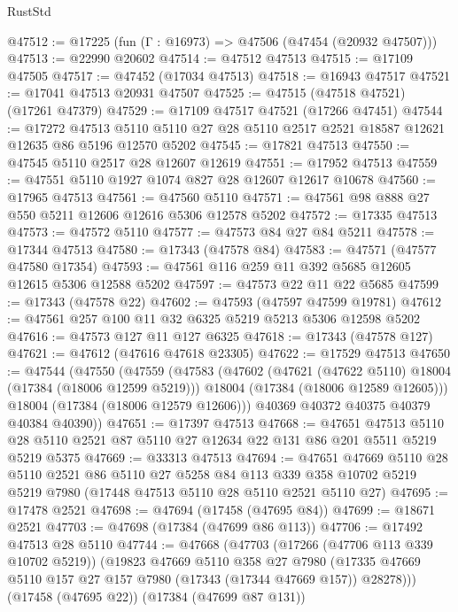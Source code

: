\begin{lexlean}{RustStd}
\begin{coremodule}
@47512 := @17225 (fun (Γ : @16973) => @47506 (@47454 (@20932 @47507)))
@47513 := @22990 @20602
@47514 := @47512 @47513
@47515 := @17109 @47505
@47517 := @47452 (@17034 @47513)
@47518 := @16943 @47517
@47521 := @17041 @47513 @20931 @47507
@47525 := @47515 (@47518 @47521) (@17261 @47379)
@47529 := @17109 @47517 @47521 (@17266 @47451)
@47544 := @17272
    @47513
    @5110
    @5110
    @27
    @28
    @5110
    @2517
    @2521
    @18587
    @12621
    @12635
    @86
    @5196
    @12570
    @5202
@47545 := @17821 @47513
@47550 := @47545 @5110 @2517 @28 @12607 @12619
@47551 := @17952 @47513
@47559 := @47551 @5110 @1927 @1074 @827 @28 @12607 @12617 @10678
@47560 := @17965 @47513
@47561 := @47560 @5110
@47571 := @47561 @98 @888 @27 @550 @5211 @12606 @12616 @5306 @12578 @5202
@47572 := @17335 @47513
@47573 := @47572 @5110
@47577 := @47573 @84 @27 @84 @5211
@47578 := @17344 @47513
@47580 := @17343 (@47578 @84)
@47583 := @47571 (@47577 @47580 @17354)
@47593 := @47561 @116 @259 @11 @392 @5685 @12605 @12615 @5306 @12588 @5202
@47597 := @47573 @22 @11 @22 @5685
@47599 := @17343 (@47578 @22)
@47602 := @47593 (@47597 @47599 @19781)
@47612 := @47561 @257 @100 @11 @32 @6325 @5219 @5213 @5306 @12598 @5202
@47616 := @47573 @127 @11 @127 @6325
@47618 := @17343 (@47578 @127)
@47621 := @47612 (@47616 @47618 @23305)
@47622 := @17529 @47513
@47650 := @47544
    (@47550
      (@47559
        (@47583
          (@47602
            (@47621 (@47622 @5110) @18004 (@17384 (@18006 @12599 @5219)))
            @18004
            (@17384 (@18006 @12589 @12605)))
          @18004
          (@17384 (@18006 @12579 @12606)))
        @40369
        @40372
        @40375
        @40379
        @40384
        @40390))
@47651 := @17397 @47513
@47668 := @47651
    @47513
    @5110
    @28
    @5110
    @2521
    @87
    @5110
    @27
    @12634
    @22
    @131
    @86
    @201
    @5511
    @5219
    @5219
    @5375
@47669 := @33313 @47513
@47694 := @47651
    @47669
    @5110
    @28
    @5110
    @2521
    @86
    @5110
    @27
    @5258
    @84
    @113
    @339
    @358
    @10702
    @5219
    @5219
    @7980
    (@17448 @47513 @5110 @28 @5110 @2521 @5110 @27)
@47695 := @17478 @2521
@47698 := @47694 (@17458 (@47695 @84))
@47699 := @18671 @2521
@47703 := @47698 (@17384 (@47699 @86 @113))
@47706 := @17492 @47513 @28 @5110
@47744 := @47668
    (@47703
      (@17266 (@47706 @113 @339 @10702 @5219))
      (@19823
        @47669
        @5110
        @358
        @27
        @7980
        (@17335 @47669 @5110 @157 @27 @157 @7980 (@17343 (@17344 @47669 @157)) @28278)))
    (@17458 (@47695 @22))
    (@17384 (@47699 @87 @131))

\end{coremodule}
\end{lexlean}
